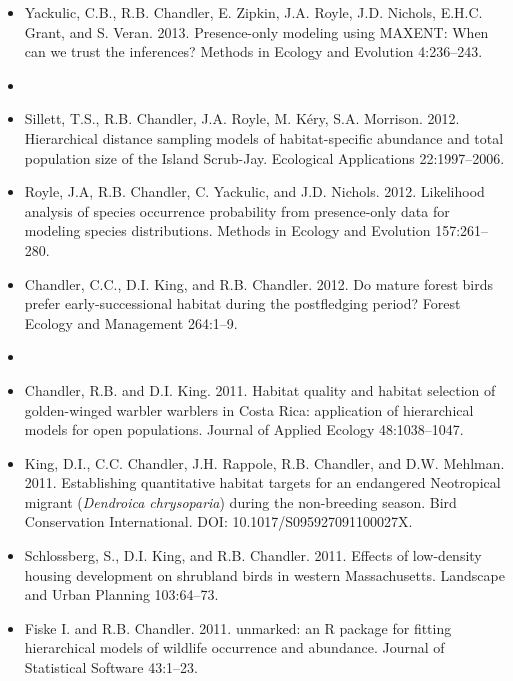 \begin{itemize}
\item Yackulic, C.B., R.B. Chandler, E. Zipkin, J.A. Royle,
  J.D. Nichols, E.H.C. Grant, and S. Veran. 2013. Presence-only
  modeling using MAXENT: When can we trust the inferences? Methods in
  Ecology and Evolution 4:236--243. 

\item[] { \\}

\item Sillett, T.S., R.B. Chandler, J.A. Royle, M. K\'{e}ry,
  S.A. Morrison. 2012. Hierarchical distance sampling models of
  habitat-specific abundance and total population size of the Island
  Scrub-Jay. Ecological Applications 22:1997--2006.

\item Royle, J.A, R.B. Chandler, C. Yackulic, and
  J.D. Nichols. 2012. Likelihood analysis of species occurrence
  probability from presence-only data for modeling species
  distributions. Methods in Ecology and Evolution 157:261--280.

\item Chandler, C.C., D.I. King, and R.B. Chandler. 2012. Do mature
  forest birds prefer early-successional habitat
  during the postfledging period? Forest Ecology and Management 264:1--9.

\item[] { \\}

\item Chandler, R.B. and D.I. King. 2011. Habitat quality and
  habitat selection of golden-winged warbler warblers in Costa Rica:
  application of hierarchical models for open populations. Journal of
  Applied Ecology 48:1038--1047.

\item King, D.I., C.C. Chandler, J.H. Rappole, R.B. Chandler, and
  D.W. Mehlman. 2011. Establishing quantitative habitat targets
  for an endangered Neotropical migrant ({\it Dendroica chrysoparia})
  during the non-breeding season. Bird Conservation
  International. DOI: 10.1017/S095927091100027X.

\item Schlossberg, S., D.I. King, and R.B. Chandler. 2011. Effects
  of low-density housing development on shrubland birds
  in western Massachusetts. Landscape and Urban Planning 103:64--73.

\item Fiske I. and R.B. Chandler. 2011. unmarked: an R package
  for fitting hierarchical models of wildlife occurrence and
  abundance. Journal of Statistical Software 43:1--23.


\end{itemize}
